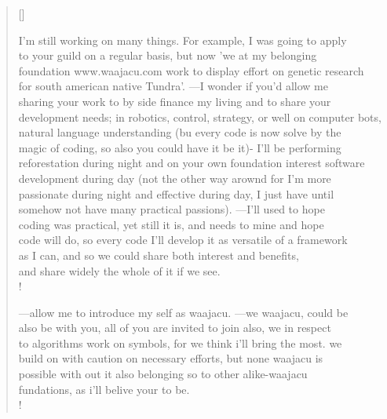 \documentclass[11pt, a4paper]{article} %
\newcommand{\poemauthorright}[1]{\nopagebreak{\raggedleft\footnotesize\textsc{#1}\par}} %
\begin{document}
{ }
\poemtitle{}

\settowidth{\versewidth}{Never coudve been less certain but more lucid about it} %

\begin{verse}[\versewidth]
{\scriptsize 


I'm still working on many things. For example, I was going to apply\\
 to your guild on a regular basis, but now 'we at my belonging \\
 foundation www.waajacu.com work to display effort on genetic research \\
 for south american native Tundra'. ---I wonder if you'd allow me \\
 sharing your work to by side finance my living and to share your \\
 development needs; in robotics, control, strategy, or well on computer bots, \\
 natural language understanding (bu every code is now solve by the \\
 magic of coding, so also you could have it be it)- I'll be performing \\
 reforestation during night and on your own foundation interest software \\
 development during day (not the other way arownd for I'm more \\
 passionate during night and effective during day, I just have until \\
 somehow not have many practical passions). ---I'll used to hope \\
 coding was practical, yet still it is, and needs to mine and hope \\
 code will do, so every code I'll develop it as versatile of a framework\\
  as I can, and so we could share both interest and benefits, \\
  and share widely the whole of it if we see. \\!


---allow me to introduce my self as waajacu. ---we waajacu, could be \\
also be with you, all of you are invited to join also, we in respect \\
to algorithms work on symbols, for we think i'll bring the most. we \\
build on with caution on necessary efforts, but none waajacu is \\
possible with out it also belonging so to other alike-waajacu \\
fundations, as i'll belive your to be. \\!

}
\end{verse}


\poemauthorright{waajacu open source fundation.} %

\end{document}
